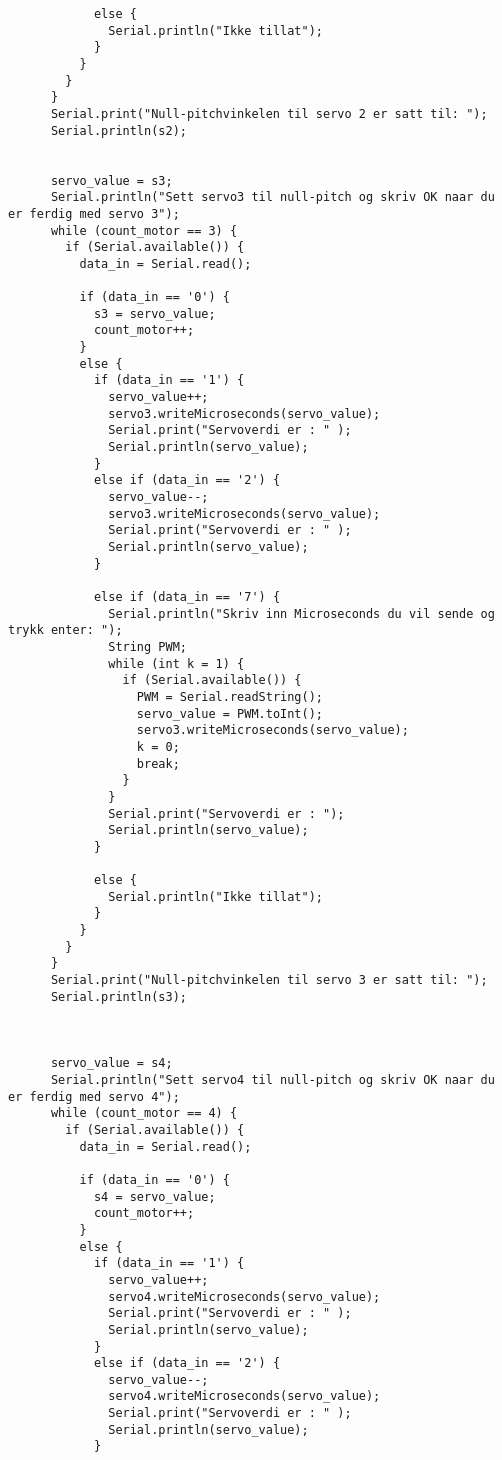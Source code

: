 \begin{lstlisting}
            else {
              Serial.println("Ikke tillat");
            }
          }
        }
      }
      Serial.print("Null-pitchvinkelen til servo 2 er satt til: ");
      Serial.println(s2);
 
 
      servo_value = s3;
      Serial.println("Sett servo3 til null-pitch og skriv OK naar du er ferdig med servo 3");
      while (count_motor == 3) {
        if (Serial.available()) {
          data_in = Serial.read();
 
          if (data_in == '0') {
            s3 = servo_value;
            count_motor++;
          }
          else {
            if (data_in == '1') {
              servo_value++;
              servo3.writeMicroseconds(servo_value);
              Serial.print("Servoverdi er : " );
              Serial.println(servo_value);
            }
            else if (data_in == '2') {
              servo_value--;
              servo3.writeMicroseconds(servo_value);
              Serial.print("Servoverdi er : " );
              Serial.println(servo_value);
            }
 
            else if (data_in == '7') {
              Serial.println("Skriv inn Microseconds du vil sende og trykk enter: ");
              String PWM;
              while (int k = 1) {
                if (Serial.available()) {
                  PWM = Serial.readString();
                  servo_value = PWM.toInt();
                  servo3.writeMicroseconds(servo_value);
                  k = 0;
                  break;
                }
              }
              Serial.print("Servoverdi er : ");
              Serial.println(servo_value);
            }
 
            else {
              Serial.println("Ikke tillat");
            }
          }
        }
      }
      Serial.print("Null-pitchvinkelen til servo 3 er satt til: ");
      Serial.println(s3);
 
 
 
      servo_value = s4;
      Serial.println("Sett servo4 til null-pitch og skriv OK naar du er ferdig med servo 4");
      while (count_motor == 4) {
        if (Serial.available()) {
          data_in = Serial.read();
 
          if (data_in == '0') {
            s4 = servo_value;
            count_motor++;
          }
          else {
            if (data_in == '1') {
              servo_value++;
              servo4.writeMicroseconds(servo_value);
              Serial.print("Servoverdi er : " );
              Serial.println(servo_value);
            }
            else if (data_in == '2') {
              servo_value--;
              servo4.writeMicroseconds(servo_value);
              Serial.print("Servoverdi er : " );
              Serial.println(servo_value);
            }
 

\end{lstlisting}
